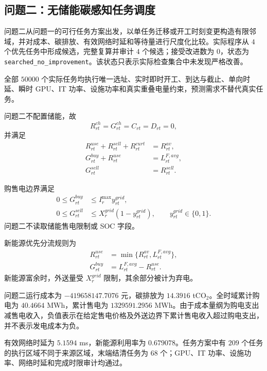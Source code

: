 \subsection{问题二：无储能碳感知任务调度}

问题二从问题一的可行任务方案出发，以单任务迁移或开工时刻变更构造有限邻域，并对成本、碳排放、有效网络时延和等待量进行尺度化比较。实际程序从 $4$ 个优先任务中形成候选，完整复算并审计 $4$ 个候选；接受改进数为 $0$，状态为 \texttt{searched\_no\_improvement}。该状态只表示实际检查集合中未发现严格改善。

全部 $50000$ 个实际任务均执行唯一选址、实时即时开工、到达与截止、单向时延、瞬时 GPU、IT 功率、设施功率和真实重叠电量约束，预测需求不替代真实任务。

问题二不配置储能，故
\begin{equation}
R_{rt}^{ch}=G_{rt}^{ch}=C_{rt}=D_{rt}=0,
\end{equation}
并满足
\begin{align}
R_{rt}^{use}+R_{rt}^{sell}+R_{rt}^{curt}&=R_{rt}^{av},\\
G_{rt}^{buy}+R_{rt}^{use}&=L_{rt}^{F,avg},\\
G_{rt}^{sell}&=R_{rt}^{sell}.
\end{align}

购售电边界满足
\begin{align}
0\le G_{rt}^{buy}&\le I_r^{\max}y_{rt}^{grid},\\
0\le G_{rt}^{sell}&\le X_r^{grid}(1-y_{rt}^{grid}),
\qquad y_{rt}^{grid}\in\{0,1\}.
\end{align}
问题二不读取储能售电限制或 SOC 字段。

新能源优先分流规则为
\begin{align}
R_{rt}^{use}&=\min\{R_{rt}^{av},L_{rt}^{F,avg}\},\\
G_{rt}^{buy}&=L_{rt}^{F,avg}-R_{rt}^{use}.
\end{align}
新能源富余时，外送量受 $X_r^{grid}$ 限制，其余部分被计为弃电。

问题二运行成本为 $-419658147.7076$ 元，碳排放为 $14.3916$ tCO$_2$。全时域累计购电为 $40.4664$ MWh，累计售电为 $1329591.2956$ MWh。由于成本量纲为购电支出减售电收入，负值表示在给定售电价格及外送边界下累计售电收入超过购电支出，并不表示发电成本为负。

有效网络时延为 $5.1594$ ms，新能源利用率为 $0.679078$。任务方案中有 $209$ 个任务的执行区域不同于来源区域，末端结清任务为 $68$ 个；GPU、IT 功率、设施功率、网络时延和完成时限审计均通过。

